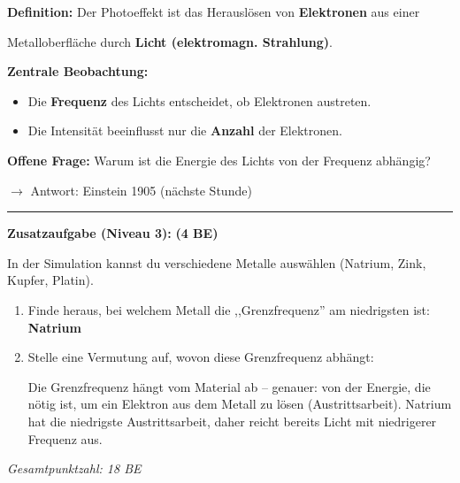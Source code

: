 \documentclass[11pt,a4paper]{article}
\begin{document}
\begin{tcolorbox}[merkbox={Kasten 1: Merksatz -- Photoeffekt}]
\textbf{Definition:} Der Photoeffekt ist das Herauslösen von \textcolor{loesung}{\textbf{Elektronen}} aus einer

Metalloberfläche durch \textcolor{loesung}{\textbf{Licht (elektromagn. Strahlung)}}.

\vspace{0.5em}

\textbf{Zentrale Beobachtung:}

\begin{itemize}[nosep]
\item Die \textcolor{loesung}{\textbf{Frequenz}} des Lichts entscheidet, ob Elektronen austreten.
\item Die Intensität beeinflusst nur die \textcolor{loesung}{\textbf{Anzahl}} der Elektronen.
\end{itemize}

\vspace{0.5em}

\textbf{Offene Frage:} Warum ist die Energie des Lichts von der Frequenz abhängig?

$\rightarrow$ Antwort: Einstein 1905 (nächste Stunde)
\end{tcolorbox}

\vspace{1em}


\hrule
\vspace{0.5em}

\textbf{Zusatzaufgabe (Niveau 3):} \hfill \textbf{(4 BE)}

In der Simulation kannst du verschiedene Metalle auswählen (Natrium, Zink, Kupfer, Platin).

\begin{enumerate}[label=\alph*)]
\item Finde heraus, bei welchem Metall die ,,Grenzfrequenz'' am niedrigsten ist: \textcolor{loesung}{\textbf{Natrium}}

\item Stelle eine Vermutung auf, wovon diese Grenzfrequenz abhängt:

\textcolor{loesung}{Die Grenzfrequenz hängt vom Material ab -- genauer: von der Energie, die nötig ist, um ein Elektron aus dem Metall zu lösen (Austrittsarbeit). Natrium hat die niedrigste Austrittsarbeit, daher reicht bereits Licht mit niedrigerer Frequenz aus.}
\end{enumerate}

\vspace{1em}

\begin{center}
\small\textit{Gesamtpunktzahl: 18 BE}
\end{center}
\end{document}
